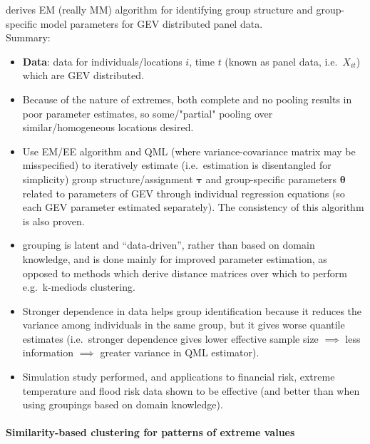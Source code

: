 \documentclass{article}
\numberwithin{equation}{section}
\begin{document}
\cite{Dupuis2023} derives EM (really MM) algorithm for identifying group structure and group-specific model parameters for GEV distributed panel data. \\
Summary:
\begin{itemize}
  \item \textbf{Data}: data for individuals/locations $i$, time $t$ (known as panel data, i.e.\ $X_{i t}$) which are GEV distributed. 
  \item Because of the nature of extremes, both complete and no pooling results in poor parameter estimates, so some/"partial" pooling over similar/homogeneous locations desired.
  \item Use EM/EE algorithm and QML (where variance-covariance matrix may be misspecified) to iteratively estimate (i.e.\ estimation is disentangled for simplicity) group structure/assignment $\bm{\tau}$ and group-specific parameters $\bm{\theta}$ related to parameters of GEV through individual regression equations (so each GEV parameter estimated separately). 
  The consistency of this algorithm is also proven.
  \item grouping is latent and ``data-driven'', rather than based on domain knowledge, and is done mainly for improved parameter estimation, as opposed to methods which derive distance matrices over which to perform e.g.\ k-mediods clustering. 
  \item Stronger dependence in data helps group identification because it reduces the variance among individuals in the same group, but it gives worse quantile estimates (i.e.\ stronger dependence gives lower effective sample size $\implies$ less information $\implies$ greater variance in QML estimator).
  \item Simulation study performed, and applications to financial risk, extreme temperature and flood risk data shown to be effective (and better than when using groupings based on domain knowledge). 
\end{itemize}

\paragraph{Similarity-based clustering for patterns of extreme values}
\end{document}
